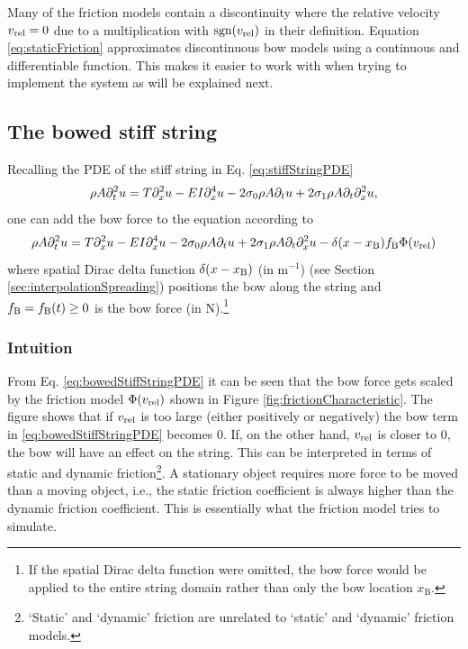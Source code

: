Many of the friction models contain a discontinuity where the relative velocity $v_\text{rel} = 0$ due to a multiplication with $\text{sgn}(v_\text{rel})$ in their definition. Equation \eqref{eq:staticFriction} approximates discontinuous bow models using a continuous and differentiable function. This makes it easier to work with when trying to implement the system as will be explained next.

\subsection{The bowed stiff string}
Recalling the PDE of the stiff string in Eq. \eqref{eq:stiffStringPDE}
\begin{equation}
    \rho A \partial_t^2 u = T \partial_x^2 u - EI \partial_x^4 u - 2 \sigma_{0} \rho A \partial_t u + 2 \sigma_{1} \rho A\partial_t \partial_x^2 u,
\end{equation}
one can add the bow force to the equation according to 
\begin{equation}\label{eq:bowedStiffStringPDE}
    \rho A \partial_t^2 u = T \partial_x^2 u - EI \partial_x^4 u - 2 \sigma_{0} \rho A \partial_t u + 2 \sigma_{1} \rho A\partial_t \partial_x^2 u - \delta(x-x_{\text{B}})f_{\text{B}}\Phi(v_\text{rel})
\end{equation}
where spatial Dirac delta function $\delta(x-x_{\text{B}})$ (in m$^{-1}$) (see Section \ref{sec:interpolationSpreading}) positions the bow along the string and $f_{\text{B}} = f_{\text{B}}(t) \geq 0$ is the bow force (in N).\footnote{If the spatial Dirac delta function were omitted, the bow force would be applied to the entire string domain rather than only the bow location $x_\text{B}$.} 

\subsubsection{Intuition}
From Eq. \eqref{eq:bowedStiffStringPDE} it can be seen that the bow force gets scaled by the friction model $\Phi(v_\text{rel})$ shown in Figure \ref{fig:frictionCharacteristic}. 
The figure shows that if $v_\text{rel}$ is too large (either positively or negatively) the bow term in \eqref{eq:bowedStiffStringPDE} becomes $0$. If, on the other hand, $v_\text{rel}$ is closer to $0$, the bow will have an effect on the string. This can be interpreted in terms of static and dynamic friction\footnote{`Static' and `dynamic' friction are unrelated to `static' and `dynamic' friction models.}. A stationary object requires more force to be moved than a moving object, i.e., the static friction coefficient is always higher than the dynamic friction coefficient. This is essentially what the friction model tries to simulate.

